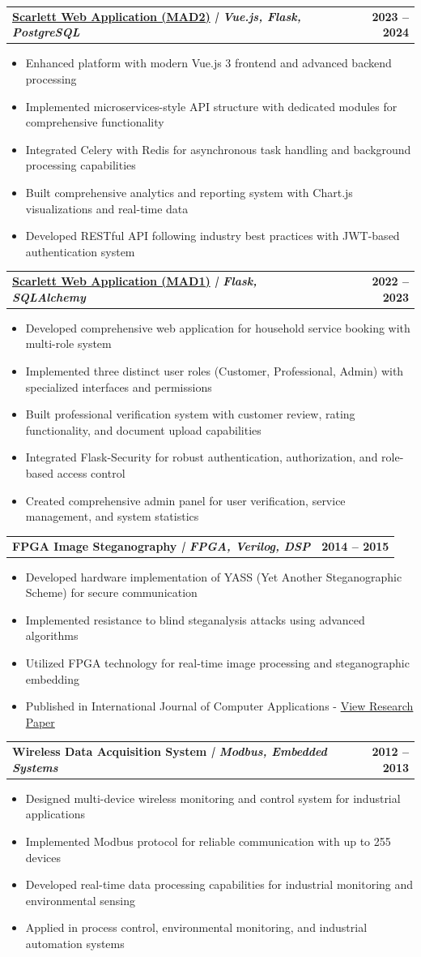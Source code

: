 \documentclass[11pt,a4paper]{article}
\makeatletter
\newcommand{\resumeItem}[1]{
    \item\small{#1 \vspace{-1pt}}
}
\newcommand{\resumeProjectHeading}[2]{
    \vspace{-1pt}\item
    \begin{tabular*}{0.97\textwidth}{l@{\extracolsep{\fill}}r}
        \small\textbf{\color{secondary}#1} & \textbf{\color{mediumgray}\small #2} \\
    \end{tabular*}\vspace{-3pt}
}
\newcommand{\resumeItemListStart}{\begin{itemize}[leftmargin=0.3in]}
\newcommand{\resumeItemListEnd}{\end{itemize}\vspace{-4pt}}
\makeatother
\begin{document}
\resumeProjectHeading
{\textbf{\href{https://github.com/milavdabgar/21f1005510-mad2}{Scarlett Web Application (MAD2)}} \textit{| Vue.js, Flask, PostgreSQL}}{2023 -- 2024}
\resumeItemListStart
\resumeItem{Enhanced platform with modern Vue.js 3 frontend and advanced backend processing}
\resumeItem{Implemented microservices-style API structure with dedicated modules for comprehensive functionality}
\resumeItem{Integrated Celery with Redis for asynchronous task handling and background processing capabilities}
\resumeItem{Built comprehensive analytics and reporting system with Chart.js visualizations and real-time data}
\resumeItem{Developed RESTful API following industry best practices with JWT-based authentication system}
\resumeItemListEnd

\resumeProjectHeading
{\textbf{\href{https://github.com/milavdabgar/21f1005510-mad1}{Scarlett Web Application (MAD1)}} \textit{| Flask, SQLAlchemy}}{2022 -- 2023}
\resumeItemListStart
\resumeItem{Developed comprehensive web application for household service booking with multi-role system}
\resumeItem{Implemented three distinct user roles (Customer, Professional, Admin) with specialized interfaces and permissions}
\resumeItem{Built professional verification system with customer review, rating functionality, and document upload capabilities}
\resumeItem{Integrated Flask-Security for robust authentication, authorization, and role-based access control}
\resumeItem{Created comprehensive admin panel for user verification, service management, and system statistics}
\resumeItemListEnd

\resumeProjectHeading
{\textbf{FPGA Image Steganography} \textit{| FPGA, Verilog, DSP}}{2014 -- 2015}
\resumeItemListStart
\resumeItem{Developed hardware implementation of YASS (Yet Another Steganographic Scheme) for secure communication}
\resumeItem{Implemented resistance to blind steganalysis attacks using advanced algorithms}
\resumeItem{Utilized FPGA technology for real-time image processing and steganographic embedding}
\resumeItem{Published in International Journal of Computer Applications - \href{https://www.ijcaonline.org/archives/volume120/number9/21259-4125}{\textcolor{primary}{View Research Paper}}}
\resumeItemListEnd

\resumeProjectHeading
{\textbf{Wireless Data Acquisition System} \textit{| Modbus, Embedded Systems}}{2012 -- 2013}
\resumeItemListStart
\resumeItem{Designed multi-device wireless monitoring and control system for industrial applications}
\resumeItem{Implemented Modbus protocol for reliable communication with up to 255 devices}
\resumeItem{Developed real-time data processing capabilities for industrial monitoring and environmental sensing}
\resumeItem{Applied in process control, environmental monitoring, and industrial automation systems}
\resumeItemListEnd
\end{document}
